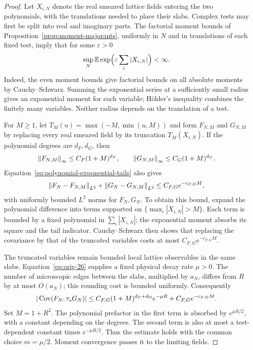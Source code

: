 \begin{proof}
Let $X_{i,N}$ denote the real smeared lattice fields entering the two
polynomials, with the translations needed to place their slabs.  Complex
tests may first be split into real and imaginary parts.  The factorial
moment bounds of Proposition~\ref{prop:moment-majorants}, uniformly in
$N$ and in translations of each fixed test, imply that for some
$\varepsilon>0$
\begin{equation}
 \sup_N \mathbb E\exp\Bigl(\varepsilon\sum_i|X_{i,N}|\Bigr)<\infty.
 \label{eq:polynomial-exponential-tails}
\end{equation}
Indeed, the even moment bounds give factorial bounds on all absolute
moments by Cauchy--Schwarz.  Summing the exponential series at a
sufficiently small radius gives an exponential moment for each variable;
H\"older's inequality combines the finitely many variables.  Neither
radius depends on the translation of a test.

For $M\ge1$, let $T_M(u)=\max(-M,\min(u,M))$ and form $F_{N,M}$ and
$G_{N,M}$ by replacing every real smeared field by its truncation
$T_M(X_{i,N})$.  If the polynomial degrees are $d_F,d_G$, then
\[
 \left\lVert F_{N,M}\right\rVert_\infty\le C_F(1+M)^{d_F},
 \qquad
 \left\lVert G_{N,M}\right\rVert_\infty\le C_G(1+M)^{d_G}.
\]
Equation~\eqref{eq:polynomial-exponential-tails} also gives
\begin{equation}
 \left\lVert F_N-F_{N,M}\right\rVert_{L^2}
 +\left\lVert G_N-G_{N,M}\right\rVert_{L^2}
 \le C_{F,G}e^{-c_{F,G}M},
 \label{eq:polynomial-truncation}
\end{equation}
with uniformly bounded $L^2$ norms for $F_N,G_N$.  To obtain this bound,
expand the polynomial difference into terms supported on
$\{\max_i|X_{i,N}|>M\}$.  Each term is bounded by a fixed polynomial in
$\sum_i|X_{i,N}|$; the exponential moment absorbs its square and the tail
indicator.  Cauchy--Schwarz then shows that replacing the covariance by
that of the truncated variables costs at most
$C_{F,G}e^{-c_{F,G}M}$.

The truncated variables remain bounded local lattice observables in the
same slabs.  Equation~\eqref{eq:orig-26} supplies a fixed physical decay
rate $\mu>0$.  The number of microscopic edges between the slabs,
multiplied by $a_N$, differs from $R$ by at most $O(a_N)$; this rounding
cost is bounded uniformly.  Consequently
\[
 |\operatorname{Cov}(F_N,\tau_sG_N)|
 \le C_{F,G}(1+M)^{d_F+d_G}e^{-\mu R}
       +C_{F,G}e^{-c_{F,G}M}.
\]
Set $M=1+R^2$.  The polynomial prefactor in the first term is absorbed
by $e^{\mu R/2}$, with a constant depending on the degrees.  The second
term is also at most a test-dependent constant times $e^{-\mu R/2}$.
Thus the estimate holds with the common choice $m=\mu/2$.  Moment
convergence passes it to the limiting fields.


\end{proof}
